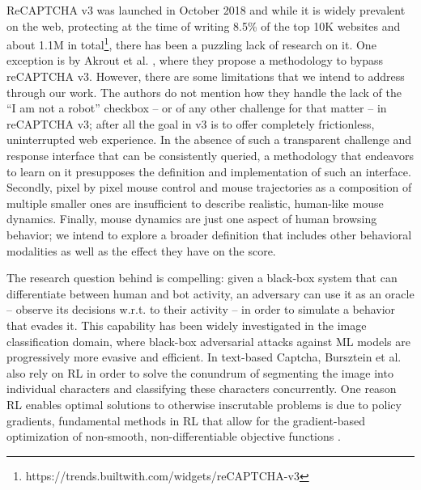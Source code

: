 ReCAPTCHA v3 was launched in October 2018 and while it is widely prevalent on the web, protecting at the time of writing 8.5\% of the top 10K websites and about 1.1M in total\footnote{https://trends.builtwith.com/widgets/reCAPTCHA-v3}, there has been a puzzling lack of research on it.
One exception is by Akrout et al. \cite{akrout2019hacking}, where they propose a methodology to bypass reCAPTCHA v3.
However, there are some limitations that we intend to address through our work.
The authors do not mention how they handle the lack of the ``I am not a robot'' checkbox -- or of any other challenge for that matter -- in reCAPTCHA v3; after all the goal in v3 is to offer completely frictionless, uninterrupted web experience.
In the absence of such a transparent challenge and response interface that can be consistently queried, a methodology that endeavors to learn on it presupposes the definition and implementation of such an interface.
Secondly, pixel by pixel mouse control and mouse trajectories as a composition of multiple smaller ones are insufficient to describe realistic, human-like mouse dynamics.
Finally, mouse dynamics are just one aspect of human browsing behavior; we intend to explore a broader definition that includes other behavioral modalities as well as the effect they have on the score. 

The research question behind \cite{akrout2019hacking} is compelling: given a black-box system that can differentiate between human and bot activity, an adversary can use it as an oracle -- observe its decisions w.r.t. to their activity -- in order to simulate a behavior that evades it.
This capability has been widely investigated in the image classification domain, where black-box adversarial attacks against \gls{ML} models are progressively more evasive and efficient\cite{brendel2017decision, ilyas2018prior}.
In text-based Captcha, Bursztein et al. \cite{bursztein2014end} also rely on \gls{RL} in order to solve the conundrum of segmenting the image into individual characters and classifying these characters concurrently.
One reason \gls{RL} enables optimal solutions to otherwise inscrutable problems is due to policy gradients, fundamental methods in \gls{RL} that allow for the gradient-based optimization of non-smooth, non-differentiable objective functions \cite{sutton1999policy}.

